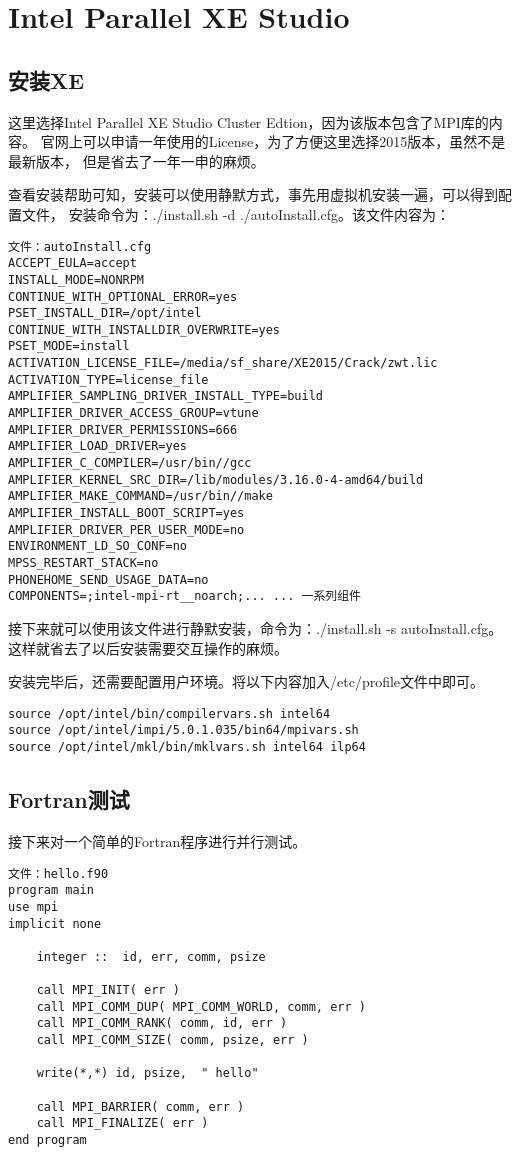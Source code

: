 ﻿\chapter{Intel Parallel XE Studio}

\section{安装XE}
这里选择Intel Parallel XE Studio Cluster Edtion，因为该版本包含了MPI库的内容。%
官网上可以申请一年使用的License，为了方便这里选择2015版本，虽然不是最新版本，%
但是省去了一年一申的麻烦。

查看安装帮助可知，安装可以使用静默方式，事先用虚拟机安装一遍，可以得到配置文件，%
安装命令为：./install.sh -d ./autoInstall.cfg。该文件内容为：
\begin{Verbatim}[]
文件：autoInstall.cfg
ACCEPT_EULA=accept
INSTALL_MODE=NONRPM
CONTINUE_WITH_OPTIONAL_ERROR=yes
PSET_INSTALL_DIR=/opt/intel
CONTINUE_WITH_INSTALLDIR_OVERWRITE=yes
PSET_MODE=install
ACTIVATION_LICENSE_FILE=/media/sf_share/XE2015/Crack/zwt.lic
ACTIVATION_TYPE=license_file
AMPLIFIER_SAMPLING_DRIVER_INSTALL_TYPE=build
AMPLIFIER_DRIVER_ACCESS_GROUP=vtune
AMPLIFIER_DRIVER_PERMISSIONS=666
AMPLIFIER_LOAD_DRIVER=yes
AMPLIFIER_C_COMPILER=/usr/bin//gcc
AMPLIFIER_KERNEL_SRC_DIR=/lib/modules/3.16.0-4-amd64/build
AMPLIFIER_MAKE_COMMAND=/usr/bin//make
AMPLIFIER_INSTALL_BOOT_SCRIPT=yes
AMPLIFIER_DRIVER_PER_USER_MODE=no
ENVIRONMENT_LD_SO_CONF=no
MPSS_RESTART_STACK=no
PHONEHOME_SEND_USAGE_DATA=no
COMPONENTS=;intel-mpi-rt__noarch;... ... 一系列组件
\end{Verbatim}

接下来就可以使用该文件进行静默安装，命令为：./install.sh -s autoInstall.cfg。%
这样就省去了以后安装需要交互操作的麻烦。

安装完毕后，还需要配置用户环境。将以下内容加入/etc/profile文件中即可。
\begin{Verbatim}[]
source /opt/intel/bin/compilervars.sh intel64
source /opt/intel/impi/5.0.1.035/bin64/mpivars.sh
source /opt/intel/mkl/bin/mklvars.sh intel64 ilp64
\end{Verbatim}

\section{Fortran测试}
接下来对一个简单的Fortran程序进行并行测试。
\begin{Verbatim}[]
文件：hello.f90
program main
use mpi
implicit none

	integer ::  id, err, comm, psize

	call MPI_INIT( err )
	call MPI_COMM_DUP( MPI_COMM_WORLD, comm, err )
	call MPI_COMM_RANK( comm, id, err )
	call MPI_COMM_SIZE( comm, psize, err )

	write(*,*) id, psize,  " hello"

	call MPI_BARRIER( comm, err )
	call MPI_FINALIZE( err )
end program
\end{Verbatim}

